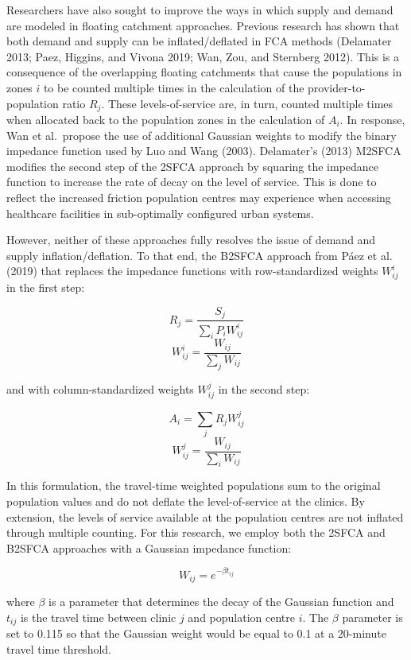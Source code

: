 \documentclass{article}
\begin{document}
Researchers have also sought to improve the ways in which supply and
demand are modeled in floating catchment approaches. Previous research
has shown that both demand and supply can be inflated/deflated in FCA
methods (Delamater 2013; Paez, Higgins, and Vivona 2019; Wan, Zou, and
Sternberg 2012). This is a consequence of the overlapping floating
catchments that cause the populations in zones \(i\) to be counted
multiple times in the calculation of the provider-to-population ratio
\(R_j\). These levels-of-service are, in turn, counted multiple times
when allocated back to the population zones in the calculation of
\(A_i\). In response, Wan et al.~propose the use of additional Gaussian
weights to modify the binary impedance function used by Luo and Wang
(2003). Delamater's (2013) M2SFCA modifies the second step of the 2SFCA
approach by squaring the impedance function to increase the rate of
decay on the level of service. This is done to reflect the increased
friction population centres may experience when accessing healthcare
facilities in sub-optimally configured urban systems.

However, neither of these approaches fully resolves the issue of demand
and supply inflation/deflation. To that end, the B2SFCA approach from
Páez et al. (2019) that replaces the impedance functions with
row-standardized weights \(W_{ij}^{i}\) in the first step:

\[
R_j = \frac{S_j}{\sum_i{P_iW_{ij}^{i}}}
\] \[
W_{ij}^{i} = \frac{W_{ij}}{\sum_j W_{ij}}
\]

and with column-standardized weights \(W_{ij}^{j}\) in the second step:

\[
A_i = \sum_j{R_jW_{ij}^{j}}
\] \[
W_{ij}^{j} = \frac{W_{ij}}{\sum_i W_{ij}}
\]

In this formulation, the travel-time weighted populations sum to the
original population values and do not deflate the level-of-service at
the clinics. By extension, the levels of service available at the
population centres are not inflated through multiple counting. For this
research, we employ both the 2SFCA and B2SFCA approaches with a Gaussian
impedance function:

\[
W_{ij} = e^{-\beta t_{ij}}
\]

where \(\beta\) is a parameter that determines the decay of the Gaussian
function and \(t_{ij}\) is the travel time between clinic \(j\) and
population centre \(i\). The \(\beta\) parameter is set to 0.115 so that
the Gaussian weight would be equal to 0.1 at a 20-minute travel time
threshold.
\end{document}
